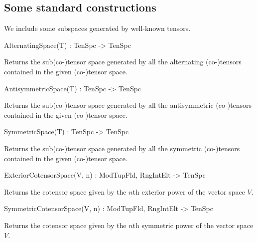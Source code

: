 \subsection{Some standard constructions}

We include some subspaces generated by well-known tensors.

\begin{intrinsics}
AlternatingSpace(T) : TenSpc -> TenSpc
\end{intrinsics}

Returns the sub(co-)tensor space generated by all the alternating (co-)tensors contained in the given (co-)tensor space.

\begin{intrinsics}
AntisymmetricSpace(T) : TenSpc -> TenSpc
\end{intrinsics}

Returns the sub(co-)tensor space generated by all the antisymmetric (co-)tensors contained in the given (co-)tensor space.

\begin{intrinsics}
SymmetricSpace(T) : TenSpc -> TenSpc
\end{intrinsics}

Returns the sub(co-)tensor space generated by all the symmetric (co-)tensors contained in the given (co-)tensor space.

\begin{intrinsics}
ExteriorCotensorSpace(V, n) : ModTupFld, RngIntElt -> TenSpc
\end{intrinsics}

Returns the cotensor space given by the $n$th exterior power of the vector space $V$.

\begin{intrinsics}
SymmetricCotensorSpace(V, n) : ModTupFld, RngIntElt -> TenSpc
\end{intrinsics}

Returns the cotensor space given by the $n$th symmetric power of the vector space $V$.

